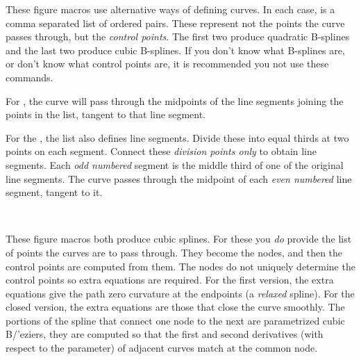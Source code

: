 \documentclass[letterpaper]{article}
\begin{document}
These figure macros use alternative ways of defining curves. In each case,
 is a comma separated list of ordered pairs. These represent
not the points the curve passes through, but the \emph{control points}.
The first two produce quadratic B-splines and the last two produce cubic
B-splines. If you don't know what B-splines are, or don't know what
control points are, it is recommended you not use these commands.

For , the curve will pass through the midpoints of the line
segments joining the points in the list, tangent to that line segment.

For the , the list also defines line segments. Divide these
into equal thirds at two points on each segment. Connect these
\emph{division points only} to obtain line segments. Each \emph{odd
numbered} segment is the middle third of one of the original line
segments. The  curve passes through the midpoint of each
\emph{even numbered} line segment, tangent to it.

\begin{cd}
\\
%
%
%
\end{cd}

These figure macros both produce cubic splines. For these you \emph{do}
provide the list of points the curves are to pass through. They become
the nodes, and then the control points are computed from them. The nodes
do not uniquely determine the control points so extra equations are
required. For the first version, the extra equations give the path zero
curvature at the endpoints (a \emph{relaxed} spline). For the closed
version, the extra equations are those that close the curve smoothly.
The portions of the spline that connect one node to the next are
parametrized cubic B/'eziers, they are computed so that the first and
second derivatives (with respect to the parameter) of adjacent curves
match at the common node.

\begin{cd}
\\
%
%
%
\end{cd}
\end{document}
